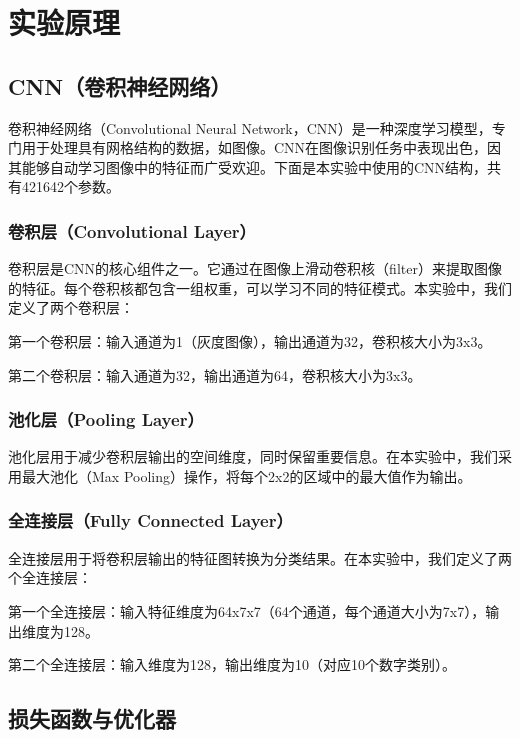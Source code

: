 \section{实验原理}\label{sec:theory}

\subsection{CNN（卷积神经网络）}

卷积神经网络（Convolutional Neural Network，CNN）是一种深度学习模型，专门用于处理具有网格结构的数据，如图像。CNN在图像识别任务中表现出色，因其能够自动学习图像中的特征而广受欢迎。下面是本实验中使用的CNN结构，共有421642个参数。

\subsubsection{卷积层（Convolutional Layer）}

卷积层是CNN的核心组件之一。它通过在图像上滑动卷积核（filter）来提取图像的特征。每个卷积核都包含一组权重，可以学习不同的特征模式。本实验中，我们定义了两个卷积层：

第一个卷积层：输入通道为1（灰度图像），输出通道为32，卷积核大小为3x3。

第二个卷积层：输入通道为32，输出通道为64，卷积核大小为3x3。

\subsubsection{池化层（Pooling Layer）}

池化层用于减少卷积层输出的空间维度，同时保留重要信息。在本实验中，我们采用最大池化（Max Pooling）操作，将每个2x2的区域中的最大值作为输出。

\subsubsection{全连接层（Fully Connected Layer）}

全连接层用于将卷积层输出的特征图转换为分类结果。在本实验中，我们定义了两个全连接层：

第一个全连接层：输入特征维度为64x7x7（64个通道，每个通道大小为7x7），输出维度为128。

第二个全连接层：输入维度为128，输出维度为10（对应10个数字类别）。

\subsection{损失函数与优化器}

